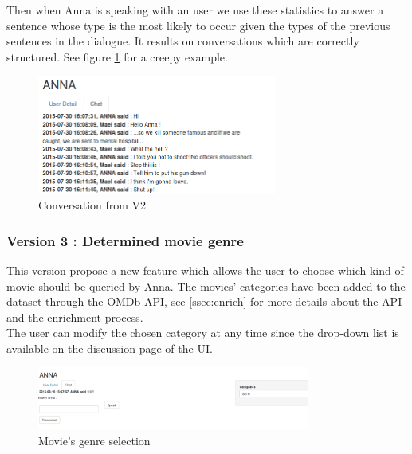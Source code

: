 Then when Anna is speaking with an user we use these statistics to answer a sentence whose type is the most likely to occur given the types of the previous sentences in the dialogue. It results on conversations which are correctly structured. See figure \ref{fig:convST} for a creepy example.
\begin{figure}[!h]
\begin{center}
\includegraphics[width=0.70\textwidth]{./img/convST.png}
\end{center}
\caption{Conversation from V2}
\label{fig:convST}
\end{figure}

\newpage
\subsubsection{Version 3 : Determined movie genre}
\label{sssec:v_genre}
This version propose a new feature which allows the user to choose which kind of movie should be queried by Anna. The movies' categories have been added to the dataset through the OMDb API, see \ref{ssec:enrich} for more details about the API and the enrichment process.\\
The user can modify the chosen category at any time since the drop-down list is available on the discussion page of the UI.
\begin{figure}[!h]
\begin{center}
\includegraphics[width=0.80\textwidth]{./img/convCat.png}
\end{center}
\caption{Movie's genre selection}
\label{fig:convCat}
\end{figure}

